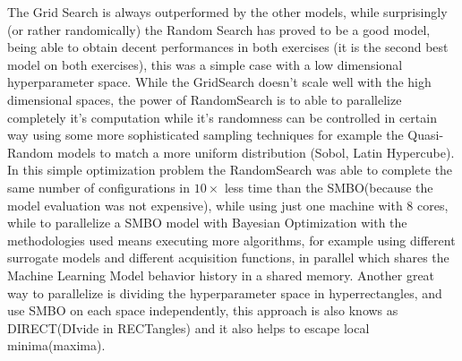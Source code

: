 \documentclass[12pt, onecolumn]{article}
\begin{document}
The Grid Search is always outperformed by the other models, while surprisingly (or rather randomically) the Random Search has proved to be a good model, being able to obtain decent performances in both exercises (it is the second best model on both exercises), this was a simple case with a low dimensional hyperparameter space.
While the GridSearch doesn't scale well with the high dimensional spaces, the power of RandomSearch is to able to parallelize completely it's computation while it's randomness can be controlled in certain way using some more sophisticated sampling techniques for example the Quasi-Random models to match a more uniform distribution (Sobol, Latin Hypercube).
In this simple optimization problem the RandomSearch was able to complete the same number of configurations in $10\times$ less time than the SMBO(because the model evaluation was not expensive), while using just one machine with 8 cores, while to parallelize a SMBO model with Bayesian Optimization with the methodologies used means executing more algorithms, for example using different surrogate models and different acquisition functions, in parallel which shares the Machine Learning Model behavior history in a shared memory.
Another great way to parallelize is dividing the hyperparameter space in hyperrectangles, and use SMBO on each space independently, this approach is also knows as DIRECT(DIvide in RECTangles) and it also helps to escape local minima(maxima).
\end{document}
